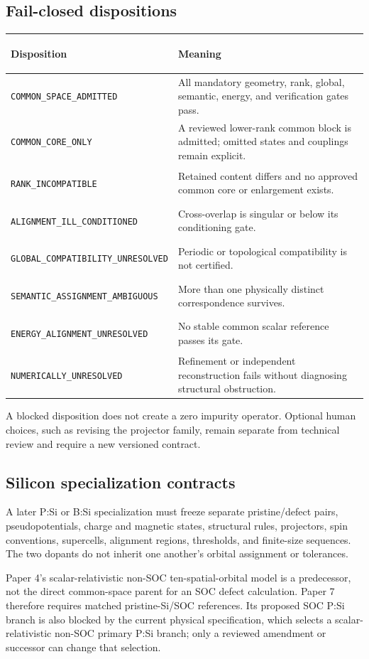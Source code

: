 \documentclass[11pt]{article}
\newenvironment{prospective}{\color{prospectivered}}{}
\begin{document}
\begin{prospective}
\subsection{Fail-closed dispositions}
\begin{center}\small
\begin{tabularx}{\textwidth}{>{\bfseries\raggedright\arraybackslash}p{}Y}
\toprule
Disposition & Meaning \\
\midrule
\nolinkurl{COMMON_SPACE_ADMITTED} & All mandatory geometry, rank, global, semantic, energy, and verification gates pass. \\
\nolinkurl{COMMON_CORE_ONLY} & A reviewed lower-rank common block is admitted; omitted states and couplings remain explicit. \\
\nolinkurl{RANK_INCOMPATIBLE} & Retained content differs and no approved common core or enlargement exists. \\
\nolinkurl{ALIGNMENT_ILL_CONDITIONED} & Cross-overlap is singular or below its conditioning gate. \\
\nolinkurl{GLOBAL_COMPATIBILITY_UNRESOLVED} & Periodic or topological compatibility is not certified. \\
\nolinkurl{SEMANTIC_ASSIGNMENT_AMBIGUOUS} & More than one physically distinct correspondence survives. \\
\nolinkurl{ENERGY_ALIGNMENT_UNRESOLVED} & No stable common scalar reference passes its gate. \\
\nolinkurl{NUMERICALLY_UNRESOLVED} & Refinement or independent reconstruction fails without diagnosing structural obstruction. \\
\bottomrule
\end{tabularx}
\end{center}
A blocked disposition does not create a zero impurity operator. Optional human choices,
such as revising the projector family, remain separate from technical review and require
a new versioned contract.

\subsection{Silicon specialization contracts}
A later P:Si or B:Si specialization must freeze separate pristine/defect pairs,
pseudopotentials, charge and magnetic states, structural rules, projectors, spin
conventions, supercells, alignment regions, thresholds, and finite-size sequences. The
two dopants do not inherit one another's orbital assignment or tolerances.

Paper 4's scalar-relativistic non-SOC ten-spatial-orbital model is a predecessor, not the
direct common-space parent for an SOC defect calculation. Paper 7 therefore requires
matched pristine-Si/SOC references. Its proposed SOC P:Si branch is also blocked by the
current physical specification, which selects a scalar-relativistic non-SOC primary
P:Si branch; only a reviewed amendment or successor can change that selection.
\end{prospective}
\end{document}
